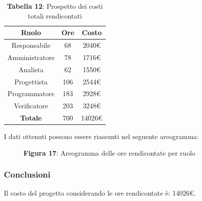 \begin{table}[H]
	\centering
	\renewcommand{\arraystretch}{1.5}
	\begin{tabular}{|c|c|c|}
		\hline
		\rowcolor{lighter-grayer}
Ruolo & Ore & Costo \\ \hline
Responsabile & 68 & 2040\euro \\ \hline
Amministratore & 78 & 1716\euro \\ \hline
Analista & 62 & 1550\euro \\ \hline
Progettista & 106 & 2544\euro \\ \hline
Programmatore & 183 & 2928\euro \\ \hline
Verificatore & 203 & 3248\euro \\ \hline
\textbf{Totale} & 700 & 14026\euro \\ \hline
	\end{tabular}
	\caption*{\textbf{Tabella 12}: Prospetto dei costi totali rendicontati \\}
\end{table}

I dati ottenuti possono essere riassunti nel seguente areogramma:


\begin{figure}[H]
	\centering
	\caption*{\textbf{Figura 17}: Areogramma delle ore rendicontate per ruolo}
    \label{fig:Figura10}
\end{figure}

\subsubsection{Conclusioni}
Il costo del progetto considerando le ore rendicontate è: 14026\euro.